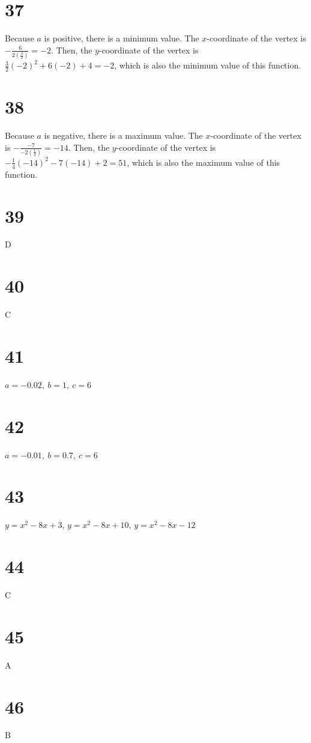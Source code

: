 \documentclass{article}
\theoremstyle{definition}
\begin{document}
\section*{37}
Because $a$ is positive, there is a minimum value. The $x$-coordinate of the vertex is $-\frac{6}{2(\frac{3}{2})}=-2$. Then, the $y$-coordinate of the vertex is 
$\frac{3}{2}(-2)^2+6(-2)+4=-2$, which is also the minimum value of this function.

\section*{38}
Because $a$ is negative, there is a maximum value. The $x$-coordinate of the vertex is $-\frac{-7}{-2(\frac{1}{4})}=-14$. Then, the $y$-coordinate of the vertex is 
$-\frac{1}{4}(-14)^2-7(-14)+2=51$, which is also the maximum value of this function.

\section*{39}
D

\section*{40}
C

\section*{41}
$a=-0.02,\ b=1,\ c=6$

\section*{42}
$a=-0.01,\ b=0.7,\ c=6$

\section*{43}
$y=x^2-8x+3$, $y=x^2-8x+10$, $y=x^2-8x-12$

\section*{44}
C

\section*{45}
A

\section*{46}
B
\end{document}
